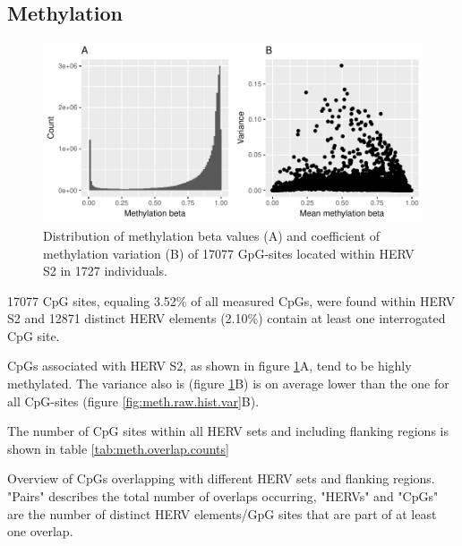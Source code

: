 \documentclass[a4paper,12pt,twoside,openright]{report}
\begin{document}
\subsection{Methylation}
\label{Results:Methylation}
\begin{figure}[tb]
	\includegraphics[scale = 1, keepaspectratio = true]{../figures/hervS2_meth_raw_hist_var}  
	\caption{Distribution of methylation beta values (A) and coefficient of methylation variation (B) of 17077 GpG-sites located within HERV S2 in 1727 individuals.}
    \label{fig:hervS2.meth.hist.var}
\end{figure}
17077 CpG sites, equaling 3.52\% of all measured CpGs, were found within HERV S2 and 12871 distinct HERV elements (2.10\%) contain at least one interrogated CpG site.

CpGs associated with HERV S2, as shown in figure \ref{fig:hervS2.meth.hist.var}A, tend to be highly methylated. The variance also is (figure \ref{fig:hervS2.meth.hist.var}B) is on average lower than the one for all CpG-sites (figure \ref{fig:meth.raw.hist.var}B).

The number of CpG sites within all HERV sets and including flanking regions is shown in table \ref{tab:meth.overlap.counts}

\begin{table}[h!]
  \begin{center}
  \end{center}        
	\caption{Overview of CpGs overlapping with different HERV sets and flanking regions. "Pairs" describes the total number of overlaps occurring, "HERVs" and "CpGs" are the number of distinct HERV elements/GpG sites that are part of at least one overlap.}
	\label{tab:meth.overlap.counts}
\end{table} 
\end{document}
